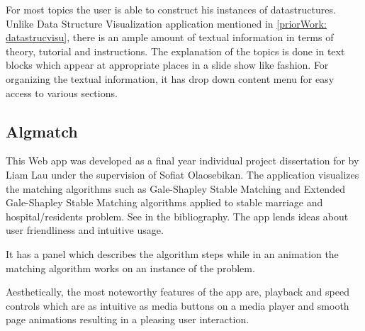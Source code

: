 For most topics the user is able to construct his instances of datastructures.
Unlike Data Structure Visualization application mentioned in
\autoref{priorWork: datastrucvisu}, there is an ample amount of textual
information in terms of theory, tutorial and instructions. The explanation of
the topics is done in text blocks which appear at appropriate places in a slide
show like fashion. For organizing the textual information, it has drop down
content menu for easy access to various sections. 

\subsection{Algmatch}
\label{priorWork: algmatch}
This Web app was developed as a final year individual project dissertation for
by Liam Lau under the supervision of Sofiat Olaosebikan. The application
visualizes the matching algorithms such as Gale-Shapley Stable Matching and
Extended Gale-Shapley Stable Matching algorithms applied to stable marriage and
hospital/residents problem. See \cite{LiamApp} in the bibliography. The app
lends ideas about user friendliness and intuitive usage.

It has a panel which describes the algorithm steps while in an animation the
matching algorithm works on an instance of the problem.

Aesthetically, the most noteworthy features of the app are, playback and speed
controls which are as intuitive as media buttons on a media player and smooth
page animations resulting in a pleasing user interaction.
